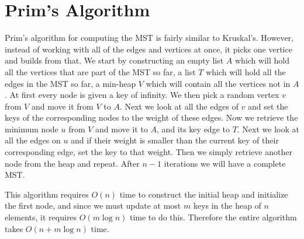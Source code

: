\section{Prim's Algorithm}
Prim's algorithm for computing the MST is fairly similar to Kruskal's. However,
instead of working with all of the edges and vertices at once, it picks one
vertice and builds from that. We start by constructing an empty list $A$ which
will hold all the vertices that are part of the MST so far, a list $T$ which
will hold all the edges in the MST so far, a min-heap $V$ which will contain all
the vertices not in $A$. At first every node is given a key of infinity. 
We then pick a random vertex $v$ from $V$ and move it from $V$ 
to $A$. Next we look at all the edges of $v$ and set the
keys of the corresponding nodes to the weight of these edges. Now we retrieve
the minimum node $u$ from $V$ and move it to $A$, and its key edge to $T$. 
Next we look at all the edges on $u$ and if their weight is smaller than
the current key of their corresponding edge, set the key to that weight. Then
we simply retrieve another node from the heap and repeat. After $n-1$ iterations
we will have a complete MST.

This algorithm requires $O(n)$ time to construct the initial heap and 
initialize the first node, and since we must update at most $m$ keys in the
heap of $n$ elements, it requires $O(m \log n)$ time to do this. Therefore the
entire algorithm takes $O(n + m \log n)$ time.

